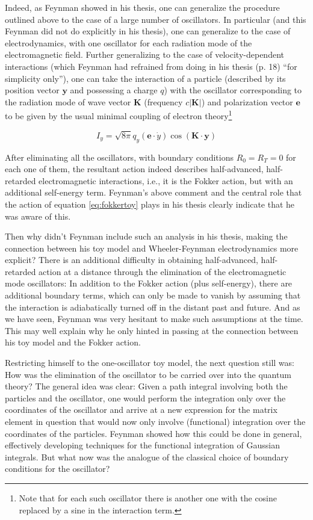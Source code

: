 \documentclass[12pt,a4paper]{article}
\begin{document}
Indeed, as Feynman showed in his thesis, one can generalize the procedure outlined above to the case of a large number of oscillators. In particular (and this Feynman did not do explicitly in his thesis), one can generalize to the case of electrodynamics, with one oscillator for each radiation mode of the electromagnetic field. Further generalizing to the case of velocity-dependent interactions (which Feynman had refrained from doing in his thesis (p. 18) ``for simplicity only''), one can take the interaction of a particle (described by its position vector $\mathbf{y}$ and possessing a charge $q$) with the oscillator corresponding to the radiation mode of wave vector $\mathbf{K}$ (frequency $c \vert \mathbf{K} \vert$) and polarization vector $\mathbf{e}$ to be given by the usual minimal coupling of electron theory\footnote{Note that for each such oscillator there is another one with the cosine replaced by a sine in the interaction term.}

\begin{equation}
I_y = \sqrt{8 \pi} q_y \left( \mathbf{e} \cdot \dot{y} \right) \cos{\left( \mathbf{K} \cdot  \mathbf{y} \right)}
\end{equation}

After eliminating all the oscillators, with boundary conditions $R_0= R_T=0$ for each one of them, the resultant action indeed describes half-advanced, half-retarded electromagnetic interactions, i.e., it is the Fokker action, but with an additional self-energy term. Feynman's above comment and the central role that the action of equation \ref{eq:fokkertoy} plays in his thesis clearly indicate that he was aware of this.

Then why didn't Feynman include such an analysis in his thesis, making the connection between his toy model and Wheeler-Feynman electrodynamics more explicit? There is an additional difficulty in obtaining half-advanced, half-retarded action at a distance through the elimination of the electromagnetic mode oscillators: In addition to the Fokker action (plus self-energy), there are additional boundary terms, which can only be made to vanish by assuming that the interaction is adiabatically turned off in the distant past and future. And as we have seen, Feynman was very hesitant to make such assumptions at the time. This may well explain why he only hinted in passing at the connection between his toy model and the Fokker action.

Restricting himself to the one-oscillator toy model, the next question still was: How was the elimination of the oscillator to be carried over into the quantum theory? The general idea was clear: Given a path integral involving both the particles and the oscillator, one would perform the integration only over the coordinates of the oscillator and arrive at a new expression for the matrix element in question that would now only involve (functional) integration over the coordinates of the particles. Feynman showed how this could be done in general, effectively developing techniques for the functional integration of Gaussian integrals. But what now was the analogue of the classical choice of boundary conditions for the oscillator?
\end{document}
